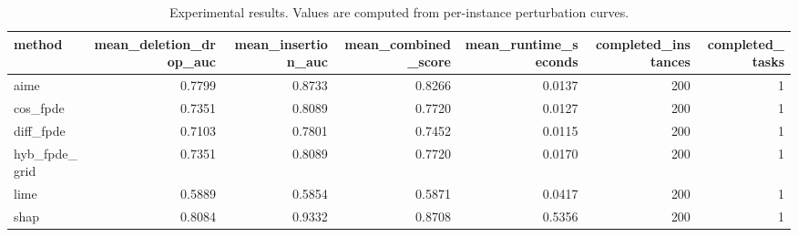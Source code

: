 \begin{table}[t]
\caption{Experimental results. Values are computed from per-instance perturbation curves.}
\label{tab:main_results_computed}
\centering
\begin{tabular}{lrrrrrr}
\toprule
method & mean\_deletion\_drop\_auc & mean\_insertion\_auc & mean\_combined\_score & mean\_runtime\_seconds & completed\_instances & completed\_tasks \\
\midrule
aime & 0.7799 & 0.8733 & 0.8266 & 0.0137 & 200 & 1 \\
cos\_fpde & 0.7351 & 0.8089 & 0.7720 & 0.0127 & 200 & 1 \\
diff\_fpde & 0.7103 & 0.7801 & 0.7452 & 0.0115 & 200 & 1 \\
hyb\_fpde\_grid & 0.7351 & 0.8089 & 0.7720 & 0.0170 & 200 & 1 \\
lime & 0.5889 & 0.5854 & 0.5871 & 0.0417 & 200 & 1 \\
shap & 0.8084 & 0.9332 & 0.8708 & 0.5356 & 200 & 1 \\
\bottomrule
\end{tabular}

\end{table}
